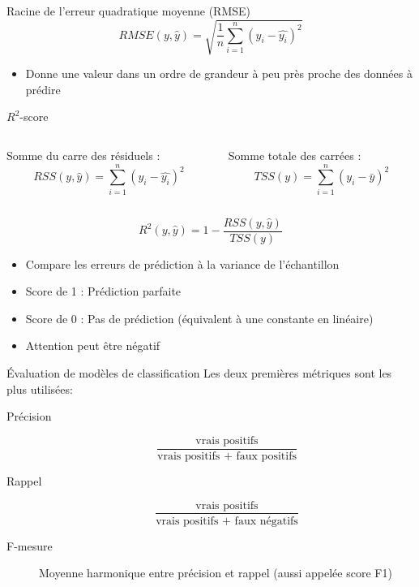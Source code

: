 \begin{frame}{Racine de l'erreur quadratique moyenne (RMSE)}
  \begin{equation*}
    RMSE(y,\hat{y})=\sqrt{\frac{1}{n}\sum^n_{i=1}(y_i-\hat{y_i})^2}
  \end{equation*}

  \begin{itemize}
    \item Donne une valeur dans un ordre de grandeur à peu près proche des données à prédire
  \end{itemize}
\end{frame}

\begin{frame}{$R^2$-score}
  \begin{columns}
    \begin{column}{0.5\linewidth}
      Somme du carre des résiduels :
      \begin{equation*}
        RSS(y,\hat{y})=\sum^n_{i=1}(y_i-\hat{y_i})^2
      \end{equation*}
    \end{column}
    \begin{column}{0.5\linewidth}
      Somme totale des carrées :
      \begin{equation*}
        TSS(y)=\sum^n_{i=1}(y_i-\bar{y})^2
      \end{equation*}
    \end{column}
  \end{columns}
  \vfill
  \begin{equation*}
    R^2(y,\hat{y})=1-\frac{RSS(y,\hat{y})}{TSS(y)}
  \end{equation*}

  \begin{itemize}
    \item Compare les erreurs de prédiction à la variance de l'échantillon
    \item Score de 1 : Prédiction parfaite
    \item Score de 0 : Pas de prédiction (équivalent à une constante en linéaire)
    \item Attention peut être négatif
  \end{itemize}
  \vfill
\end{frame}

\begin{frame}{Évaluation de modèles de classification}
  Les deux premières métriques sont les plus utilisées:
  \begin{description}
  \item[Précision]
    \[
    \frac{\text{vrais positifs}}{\text{vrais positifs + faux positifs}}
    \]
  \item[Rappel]
    \[
    \frac{\text{vrais positifs}}{\text{vrais positifs + faux négatifs}}
  \]
  \item[F-mesure] Moyenne harmonique entre précision et rappel (aussi appelée score F1)
  \end{description}
\end{frame}

